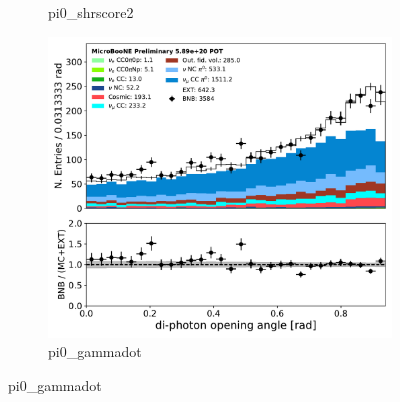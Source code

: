 \begin{figure}[H]
\begin{center}
\begin{subfigure}[b]{0.3\textwidth}
    \caption{\label{fig:pi0:inputs:shrscore2:RUN1} pi0\_shrscore2}
    \end{subfigure}
    \begin{subfigure}[b]{0.3\textwidth}
    \centering
    \includegraphics[width=1.00\textwidth]{pi0/inputs/pi0_gammadot_03182020_presel.pdf}
    \caption{\label{fig:pi0:inputs:gammadot:RUN1} pi0\_gammadot}
    \end{subfigure}
\end{center}
\end{figure}

